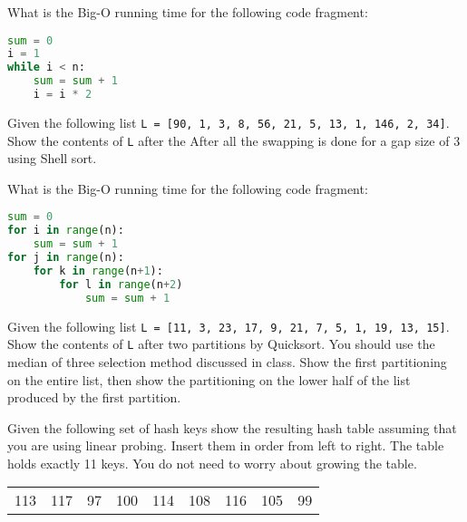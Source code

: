 \documentclass[11pt]{exam}
\begin{document}
\begin{questions}
\question[5]  What is the Big-O running time for the following code fragment:
\begin{lstlisting}[language=python]
sum = 0
i = 1
while i < n:
    sum = sum + 1
    i = i * 2
\end{lstlisting}
\vspace{1in}

\newpage
\question[10] Given the following list \lstinline{L = [90, 1, 3, 8, 56, 21, 5, 13, 1, 146, 2, 34]}.  Show the contents of \lstinline{L} after the After all the swapping is done for a gap size of 3 using Shell sort.
\vspace{4.5in}


\question[5]  What is the Big-O running time for the following code fragment:
\begin{lstlisting}[language=python]
sum = 0
for i in range(n):
    sum = sum + 1
for j in range(n):
    for k in range(n+1):
        for l in range(n+2)
            sum = sum + 1
\end{lstlisting}
\vspace{1in}

\newpage
\question[10] Given the following list 
\lstinline{L = [11, 3, 23, 17, 9, 21, 7, 5, 1, 19, 13, 15]}.  Show the contents of \lstinline{L} after two partitions by Quicksort.  You should use the median of three selection method discussed in class.  Show the first partitioning on the entire list, then show the partitioning on the lower half of the list produced by the first partition.
\vspace{4.5in}


\newpage
\question[10] Given the following set of hash keys show the resulting hash table assuming that you are using linear probing.  Insert them in order from left to right.  The table holds exactly 11 keys.  You do not need to worry about growing the table.

\begin{table}[h!]
	\begin{center}
	\begin{tabular}{|c|c|c|c|c|c|c|c|c|}
    113 & 117 & 97 & 100 & 114 & 108 & 116 & 105 & 99 \\
     \end{tabular}
	\end{center}
	\label{htab}
\end{table}
\vspace{3in}


\end{questions}
\end{document}
